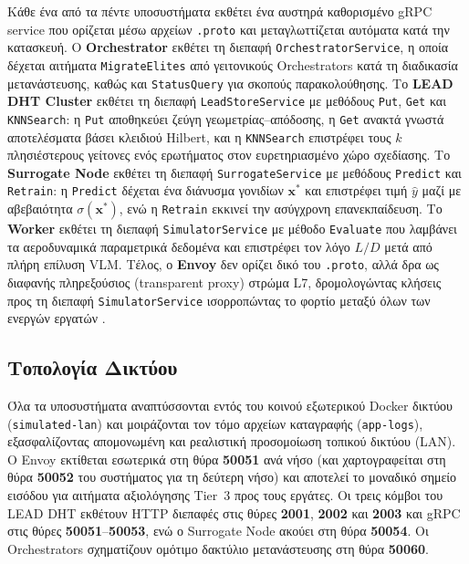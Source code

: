 Κάθε ένα από τα πέντε υποσυστήματα εκθέτει ένα αυστηρά καθορισμένο gRPC service που ορίζεται μέσω αρχείων \texttt{.proto} και μεταγλωττίζεται αυτόματα κατά την κατασκευή. Ο \textbf{Orchestrator} εκθέτει τη διεπαφή \texttt{OrchestratorService}, η οποία δέχεται αιτήματα \texttt{MigrateElites} από γειτονικούς Orchestrators κατά τη διαδικασία μετανάστευσης, καθώς και \texttt{StatusQuery} για σκοπούς παρακολούθησης. Το \textbf{LEAD DHT Cluster} εκθέτει τη διεπαφή \texttt{LeadStoreService} με μεθόδους \texttt{Put}, \texttt{Get} και \texttt{KNNSearch}: η \texttt{Put} αποθηκεύει ζεύγη γεωμετρίας–απόδοσης, η \texttt{Get} ανακτά γνωστά αποτελέσματα βάσει κλειδιού Hilbert, και η \texttt{KNNSearch} επιστρέφει τους $k$ πλησιέστερους γείτονες ενός ερωτήματος στον ευρετηριασμένο χώρο σχεδίασης. Το \textbf{Surrogate Node} εκθέτει τη διεπαφή \texttt{SurrogateService} με μεθόδους \texttt{Predict} και \texttt{Retrain}: η \texttt{Predict} δέχεται ένα διάνυσμα γονιδίων $\bm{x}^*$ και επιστρέφει τιμή $\hat{y}$ μαζί με αβεβαιότητα $\sigma(\bm{x}^*)$, ενώ η \texttt{Retrain} εκκινεί την ασύγχρονη επανεκπαίδευση. Το \textbf{Worker} εκθέτει τη διεπαφή \texttt{SimulatorService} με μέθοδο \texttt{Evaluate} που λαμβάνει τα αεροδυναμικά παραμετρικά δεδομένα και επιστρέφει τον λόγο $L/D$ μετά από πλήρη επίλυση VLM. Τέλος, ο \textbf{Envoy} δεν ορίζει δικό του \texttt{.proto}, αλλά δρα ως διαφανής πληρεξούσιος (transparent proxy) στρώμα L7, δρομολογώντας κλήσεις προς τη διεπαφή \texttt{SimulatorService} ισορροπώντας το φορτίο μεταξύ όλων των ενεργών εργατών \cite{klein2017envoy}.

\subsection*{Τοπολογία Δικτύου}

Όλα τα υποσυστήματα αναπτύσσονται εντός του κοινού εξωτερικού Docker δικτύου (\texttt{simulated-lan}) και μοιράζονται τον τόμο αρχείων καταγραφής (\texttt{app-logs}), εξασφαλίζοντας απομονωμένη και ρεαλιστική προσομοίωση τοπικού δικτύου (LAN). Ο Envoy εκτίθεται εσωτερικά στη θύρα \textbf{50051} ανά νήσο (και χαρτογραφείται στη θύρα \textbf{50052} του συστήματος για τη δεύτερη νήσο) και αποτελεί το μοναδικό σημείο εισόδου για αιτήματα αξιολόγησης Tier~3 προς τους εργάτες. Οι τρεις κόμβοι του LEAD DHT εκθέτουν HTTP διεπαφές στις θύρες \textbf{2001}, \textbf{2002} και \textbf{2003} και gRPC στις θύρες \textbf{50051}--\textbf{50053}, ενώ ο Surrogate Node ακούει στη θύρα \textbf{50054}. Οι Orchestrators σχηματίζουν ομότιμο δακτύλιο μετανάστευσης στη θύρα \textbf{50060}.

